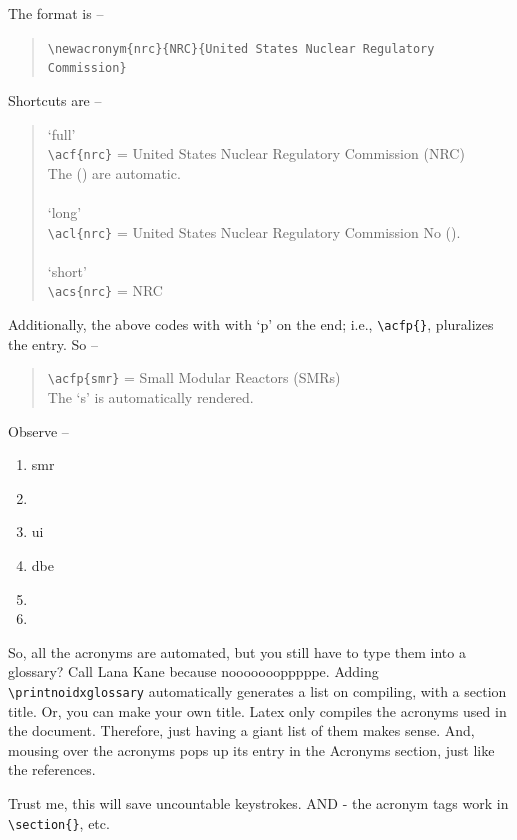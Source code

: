 \documentclass[11pt,a4paper]{article}
\newcommand{\acf}{\acrfull} %
\newcommand{\acl}{\acrlong} %
\newcommand{\acs}{\acrshort} %
\newcommand{\acfp}{\acrfullpl} %
\newcommand{\acsp}{\acrshortpl} %
\begin{document}
The format is --
\begin{quote}
    \verb=\newacronym{nrc}{NRC}{United States Nuclear Regulatory Commission}=
\end{quote}

Shortcuts are -- 
\begin{quote}
    `full'\\
    \verb=\acf{nrc}= = United States Nuclear Regulatory Commission (NRC)\\
    The () are automatic.
    \\ \\
    `long'\\
    \verb=\acl{nrc}= = United States Nuclear Regulatory Commission
    No ().
    \\ \\
    `short'\\
    \verb=\acs{nrc}= = NRC
\end{quote}

Additionally, the above codes with with `p' on the end; i.e., \verb=\acfp{}=, pluralizes the entry. So --
\begin{quote}
    \verb=\acfp{smr}= = Small Modular Reactors (SMRs)\\
    The `s' is automatically rendered.
\end{quote}

Observe --
\begin{enumerate}[item-label=(\arabic*)]
    \item\acf{smr}
    \item\acfp{smr}
    \item\acf{ui}
    \item\acf{dbe}
    \item\acfp{dbe}
    \item\acsp{dbe}
\end{enumerate}

So, all the acronyms are automated, but you still have to type them into a glossary? Call Lana Kane because nooooooopppppe. Adding \verb=\printnoidxglossary= automatically generates a list on compiling, with a section title. Or, you can make your own title. Latex only compiles the acronyms used in the document. Therefore, just having a giant list of them makes sense. And, mousing over the acronyms pops up its entry in the Acronyms section, just like the references. 

Trust me, this will save uncountable keystrokes. AND - the acronym tags work in \verb=\section{}=, etc.
\end{document}
